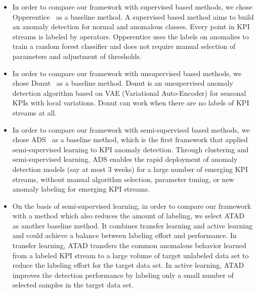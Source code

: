 \begin{itemize}
\item
  In order to compare our framework \name{} with supervised based methods, we chose Opperentice~\cite{liu2015opprentice} as a baseline method. A supervised based method aims to build an anomaly detection for normal and anomalous classes. Every point in KPI streams is labeled by operators. Opperentice uses the labels on anomalies to train a random forest classifier and does not require manual selection of parameters and adjustment of thresholds.
  \item 
  In order to compare our framework \name{} with unsupervised based methods, we chose Donut~\cite{xu2018unsupervised} as a baseline method. Donut is an unsupervised anomaly detection algorithm based on VAE (Variational Auto-Encoder) for seasonal KPIs with local variations. Donut can work when there are no labels of KPI streams at all.
  \item  
  In order to compare our framework \name{} with semi-supervised based methods, we chose ADS~\cite{ADSarticle} as a baseline method, which is the first framework that applied semi-supervised learning to KPI anomaly detection. Through clustering and semi-supervised learning, ADS enables the rapid deployment of anomaly detection models (say at most 3 weeks) for a large number of emerging KPI streams, without manual algorithm selection, parameter tuning, or new anomaly labeling for emerging KPI streams. 
  \item 
  On the basis of semi-supervised learning, in order to compare our framework \name{} with a method which also reduces the amount of labeling, we select ATAD~\cite{atad} as another baseline method. It combines transfer learning and active learning and could achieve a balance between labeling effort and performance. In transfer learning, ATAD transfers the common anomalous behavior learned from a labeled KPI stream to a large volume of target unlabeled data set to reduce the labeling effort for the target data set. In active learning, ATAD improves the detection performance by labeling only a small number of selected samples in the target data set. 
  

\end{itemize}

